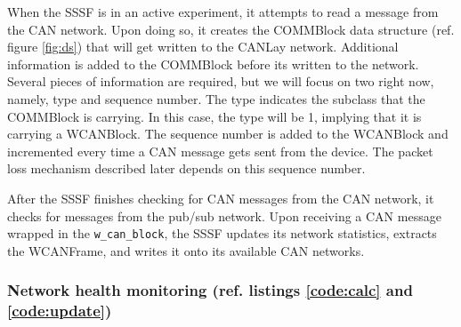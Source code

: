 \documentclass[letterpaper,twocolumn,12pt]{article}
\begin{document}
When the SSSF is in an active experiment, it attempts to read a message from the CAN network. Upon doing so, it creates the COMMBlock data structure (ref. figure \ref{fig:ds}) that will get written to the CANLay network. 
Additional information is added to the COMMBlock before its written to the network. Several pieces of information are required, but we will focus on two right now, namely, type and sequence number.
The type indicates the subclass that the COMMBlock is carrying. In this case, the type will be 1, implying that it is carrying a WCANBlock. 
The sequence number is added to the WCANBlock and incremented every time a CAN message gets sent from the device. 
The packet loss mechanism described later depends on this sequence number. 

After the SSSF finishes checking for CAN messages from the CAN network, it checks for messages from the pub/sub network.
Upon receiving a CAN message wrapped in the \texttt{w\_can\_block}, the SSSF updates its network statistics, extracts the WCANFrame, and writes it onto its available CAN networks.

\subsubsection{Network health monitoring (ref. listings \ref{code:calc} and \ref{code:update})}\label{sec:nethealth}
\end{document}
